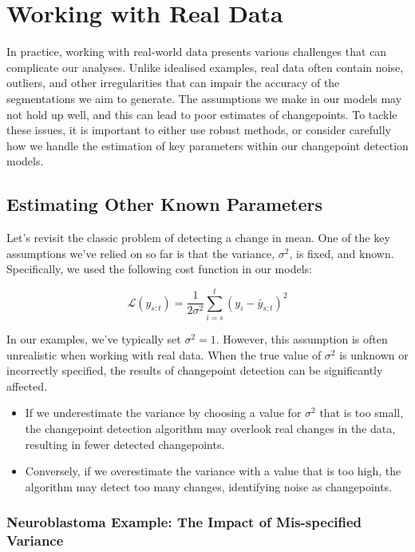 \documentclass[
  letterpaper,
  DIV=11,
  numbers=noendperiod]{scrreprt}
\providecommand{\tightlist}{%
  \setlength{\itemsep}{0pt}\setlength{\parskip}{0pt}}\usepackage{longtable,booktabs,array}
\begin{document}

\chapter{Working with Real Data}\label{working-with-real-data}

In practice, working with real-world data presents various challenges
that can complicate our analyses. Unlike idealised examples, real data
often contain noise, outliers, and other irregularities that can impair
the accuracy of the segmentations we aim to generate. The assumptions we
make in our models may not hold up well, and this can lead to poor
estimates of changepoints. To tackle these issues, it is important to
either use robust methods, or consider carefully how we handle the
estimation of key parameters within our changepoint detection models.

\section{Estimating Other Known
Parameters}\label{estimating-other-known-parameters}

Let's revisit the classic problem of detecting a change in mean. One of
the key assumptions we've relied on so far is that the variance,
\(\sigma^2\), is fixed, and known. Specifically, we used the following
cost function in our models:

\[
\mathcal{L}(y_{s:t}) = \frac{1}{2\sigma^2}  \sum_{i = s}^{t} \left ( y_i - \bar{y}_{s:t} \right)^2
\]

In our examples, we've typically set \(\sigma^2 = 1\). However, this
assumption is often unrealistic when working with real data. When the
true value of \(\sigma^2\) is unknown or incorrectly specified, the
results of changepoint detection can be significantly affected.

\begin{itemize}
\tightlist
\item
  If we underestimate the variance by choosing a value for \(\sigma^2\)
  that is too small, the changepoint detection algorithm may overlook
  real changes in the data, resulting in fewer detected changepoints.
\item
  Conversely, if we overestimate the variance with a value that is too
  high, the algorithm may detect too many changes, identifying noise as
  changepoints.
\end{itemize}

\subsection{Neuroblastoma Example: The Impact of Mis-specified
Variance}\label{neuroblastoma-example-the-impact-of-mis-specified-variance}
\end{document}
